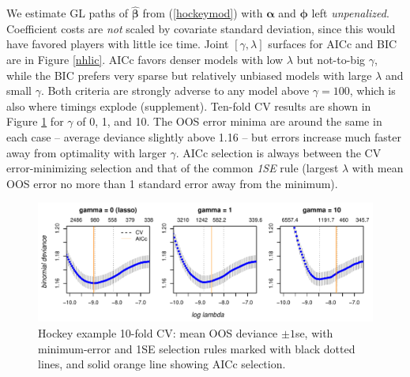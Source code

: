 \documentclass[12pt]{article}
\newcommand{\bs}[1]{\boldsymbol{#1}}
\begin{document}
We estimate GL paths of $\bs{\hat\beta}$ from (\ref{hockeymod}) with
$\bs{\alpha}$ and $\bs{\phi}$ left {\it unpenalized}. Coefficient costs are
{\it not} scaled by covariate standard deviation, since this would have
favored players with little ice time.   Joint $[\gamma,\lambda]$ surfaces for AICc and BIC are in Figure \ref{nhlic}.
AICc favors denser models with low $\lambda$ but not-to-big $\gamma$,
while the BIC  prefers very sparse but relatively unbiased  models with large
$\lambda$ and small $\gamma$.  Both criteria are strongly adverse to any model
above $\gamma=100$, which is also where timings explode (supplement).  Ten-fold CV results are shown in Figure
\ref{nhlcv} for $\gamma$ of 0, 1, and 10.  The OOS error minima are around the
same in each case -- average deviance slightly above 1.16 -- but errors
increase much faster away from optimality with larger $\gamma$.  AICc selection is always between the CV error-minimizing selection and that of the common {\it 1SE} rule (largest $\lambda$ with mean OOS error no more than
1 standard error away from the minimum). 



\begin{figure}[tb]
\includegraphics[width=6.3in]{nhl_cv}
\caption{\label{nhlcv} Hockey example 10-fold CV: mean OOS deviance $\pm 1$se, with minimum-error and 1SE selection rules marked with black dotted lines, and solid orange line showing AICc selection. }
\end{figure}
\end{document}
